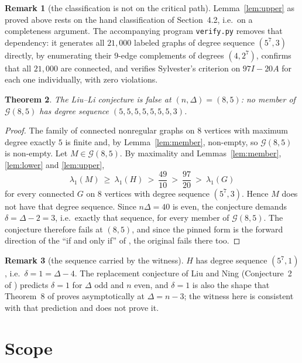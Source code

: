 \documentclass[11pt]{amsart}
\newtheorem{theorem}{Theorem}
\theoremstyle{definition}
\newtheorem{remark}[theorem]{Remark}
\begin{document}
\begin{remark}[the classification is not on the critical path]\label{rem:sweep}
Lemma~\ref{lem:upper} as proved above rests on the hand classification of
Section~4.2, i.e.\ on a completeness argument. The accompanying program
\texttt{verify.py} removes that dependency: it generates all $21{,}000$ labeled
graphs of degree sequence $(5^7,3)$ directly, by enumerating their $9$-edge
complements of degrees $(4,2^7)$, confirms that all $21{,}000$ are connected, and
verifies Sylvester's criterion on $97I-20A$ for each one individually, with zero
violations.
\end{remark}

\begin{theorem}\label{thm:main}
The Liu--Li conjecture is false at $(n,\Delta)=(8,5)$: no member of
$\mathcal{G}(8,5)$ has degree sequence $(5,5,5,5,5,5,5,3)$.
\end{theorem}

\begin{proof}
The family of connected nonregular graphs on $8$ vertices with maximum degree
exactly $5$ is finite and, by Lemma~\ref{lem:member}, non-empty, so
$\mathcal{G}(8,5)$ is non-empty. Let $M\in\mathcal{G}(8,5)$. By maximality and
Lemmas~\ref{lem:member}, \ref{lem:lower} and \ref{lem:upper},
\[
\lambda_1(M)\ \ge\ \lambda_1(H)\ >\ \frac{49}{10}\ >\ \frac{97}{20}\ >\ \lambda_1(G)
\]
for every connected $G$ on $8$ vertices with degree sequence $(5^7,3)$. Hence
$M$ does not have that degree sequence. Since $n\Delta=40$ is even, the
conjecture demands $\delta=\Delta-2=3$, i.e.\ exactly that sequence, for every
member of $\mathcal{G}(8,5)$. The conjecture therefore fails at $(8,5)$, and
since the pinned form is the forward direction of the ``if and only if'' of
\cite{LiuLi}, the original fails there too.
\end{proof}

\begin{remark}[the sequence carried by the witness]
$H$ has degree sequence $(5^7,1)$, i.e.\ $\delta=1=\Delta-4$. The replacement
conjecture of Liu and Ning \cite{LiuNing} (Conjecture~2 of \cite{HLY}) predicts
$\delta=1$ for $\Delta$ odd and $n$ even, and $\delta=1$ is also the shape that
Theorem~8 of \cite{HLY} proves asymptotically at $\Delta=n-3$; the witness here
is consistent with that prediction and does not prove it.
\end{remark}

\section{Scope}\label{sec:notsettled}
\end{document}
